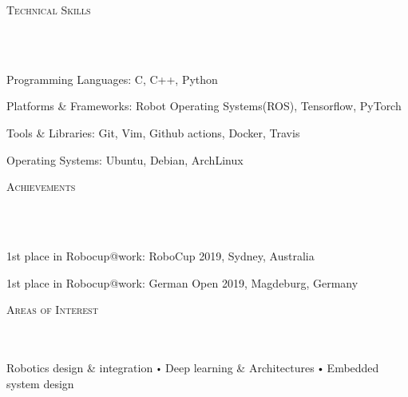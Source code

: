 \documentclass{article}
\newcommand{\header}[1]{{
\hspace*{-15pt}\vspace*{6pt} \textsc{#1}} \vspace*{-6pt} 
\lineunder
}
\newcommand{\lineunder}{
\vspace*{-8pt} \\ \hspace*{-18pt} 
\hrulefill \\
}
\newcommand{\content}{
\vspace*{2pt}%
}
\renewcommand{\labelitemi}{
$\vcenter{\hbox{\tiny$\bullet$}}$\hspace*{3pt}
}
\renewcommand{\labelitemii}{
$\vcenter{\hbox{\tiny$\bullet$}}$\hspace*{-3pt}
}
\newenvironment{bullet-list-major}{
\begin{list}{\labelitemii}{\setlength\leftmargin{3pt} 
\topsep 0pt \itemsep -2pt}}{\vspace*{4pt}\end{list}
}
\begin{document}
\vspace*{4pt}%
\header{Technical Skills}
    \begin{bullet-list-major}
    \item Programming Languages: C, C++, Python
    \vspace{2pt}
    \item Platforms \& Frameworks: Robot Operating Systems(ROS), Tensorflow, PyTorch
    \vspace{2pt}
    \item Tools \& Libraries: Git, Vim, Github actions, Docker, Travis
    \vspace{2pt}
    \item Operating Systems: Ubuntu, Debian, ArchLinux
    \end{bullet-list-major}

\vspace*{4pt}%
\header{Achievements}
    \begin{bullet-list-major}
    \item 1st place in Robocup@work: RoboCup 2019, Sydney, Australia
    \item 1st place in Robocup@work: German Open 2019, Magdeburg, Germany
    \end{bullet-list-major}

\vspace*{4pt}%
\header{Areas of Interest}
    \content{Robotics design \& integration \labelitemi Deep learning \& Architectures \labelitemi Embedded system design  \vspace{5pt}}
\end{document}
